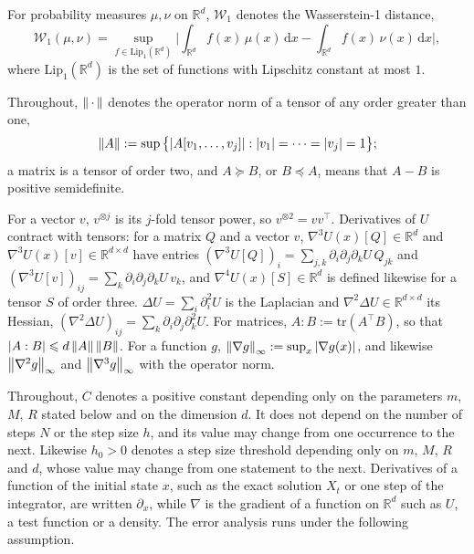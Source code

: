\documentclass[namedate,webpdf,imanum]{ima-authoring-template}
\newcommand{\Le}{\leqslant}
\newcommand{\D}{\mathrm{d}}
\theoremstyle{thmstyletwo}
\numberwithin{equation}{section}
\begin{document}
For probability measures $\mu,\nu$ on $\mathbb R^d$, $\mathcal W_1$ denotes the Wasserstein-1 distance,
\begin{equation}
    \mathcal W_1(\mu,\nu) = \sup_{f\in \mathrm{Lip}_1(\mathbb R^d)}
    \bigg| \int_{\mathbb R^d} f(x)\, \mu(x)\, \D x - \int_{\mathbb R^d} f(x)\, \nu(x)\, \D x \bigg| ,
    \label{eq: KR duality}
\end{equation}
where $\mathrm{Lip}_1(\mathbb R^d)$ is the set of functions with Lipschitz constant at most $1$.

Throughout, $\norm{\,\cdot\,}$ denotes the operator norm of a tensor of any order greater than one,
\begin{equation*}
    \norm{A} := \sup\,\bigl\{ |A[v_1, \dots, v_j]| : |v_1| = \dots = |v_j| = 1 \bigr\} ;
\end{equation*}
a matrix is a tensor of order two, and $A \succeq B$, or $B \preceq A$, means that $A - B$ is positive semidefinite.

For a vector $v$, $v^{\otimes j}$ is its $j$-fold tensor power, so $v^{\otimes 2} = v v^\top$. Derivatives of $U$ contract with tensors: for a matrix $Q$ and a vector $v$, $\nabla^3 U(x)[Q] \in \mathbb R^d$ and $\nabla^3 U(x)[v] \in \mathbb R^{d \times d}$ have entries $(\nabla^3 U[Q])_i = \sum_{j,k} \partial_i \partial_j \partial_k U\, Q_{jk}$ and $(\nabla^3 U[v])_{ij} = \sum_k \partial_i \partial_j \partial_k U\, v_k$, and $\nabla^4 U(x)[S] \in \mathbb R^d$ is defined likewise for a tensor $S$ of order three. $\Delta U = \sum_i \partial_i^2 U$ is the Laplacian and $\nabla^2 \Delta U \in \mathbb R^{d \times d}$ its Hessian, $(\nabla^2 \Delta U)_{ij} = \sum_k \partial_i \partial_j \partial_k^2 U$. For matrices, $A : B := \mathrm{tr}(A^\top B)$, so that $|A : B| \Le d\, \norm{A}\, \norm{B}$. For a function $g$, $\norm{\nabla g}_\infty := \sup_x |\nabla g(x)|$, and likewise $\norm{\nabla^2 g}_\infty$ and $\norm{\nabla^3 g}_\infty$ with the operator norm.

Throughout, $C$ denotes a positive constant depending only on the parameters $m$, $M$, $R$ stated below and on the dimension $d$. It does not depend on the number of steps $N$ or the step size $h$, and its value may change from one occurrence to the next. Likewise $h_0 > 0$ denotes a step size threshold depending only on $m$, $M$, $R$ and $d$, whose value may change from one statement to the next. Derivatives of a function of the initial state $x$, such as the exact solution $X_t$ or one step of the integrator, are written $\partial_x$, while $\nabla$ is the gradient of a function on $\mathbb R^d$ such as $U$, a test function or a density. The error analysis runs under the following assumption.
\end{document}
